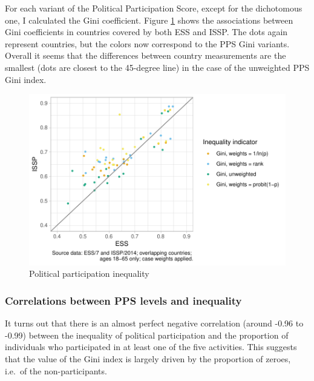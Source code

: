 \documentclass[12pt,]{article}
\begin{document}
For each variant of the Political Participation Score, except for the dichotomous one, I calculated the Gini coefficient. Figure \ref{fig:part-gini-dot-plot} shows the associations between Gini coefficients in countries covered by both ESS and ISSP. The dots again represent countries, but the colors now correspond to the PPS Gini variants. Overall it seems that the differences between country measurements are the smallest (dots are closest to the 45-degree line) in the case of the unweighted PPS Gini index.

\begin{figure}[H]

{\centering \includegraphics{report_files/figure-latex/part-gini-dot-plot-1} 

}

\caption{Political participation inequality}\label{fig:part-gini-dot-plot}
\end{figure}

\hypertarget{correlations-between-pps-levels-and-inequality}{%
\subsubsection{Correlations between PPS levels and inequality}\label{correlations-between-pps-levels-and-inequality}}

It turns out that there is an almost perfect negative correlation (around -0.96 to -0.99) between the inequality of political participation and the proportion of individuals who participated in at least one of the five activities. This suggests that the value of the Gini index is largely driven by the proportion of zeroes, i.e.~of the non-participants.
\end{document}
